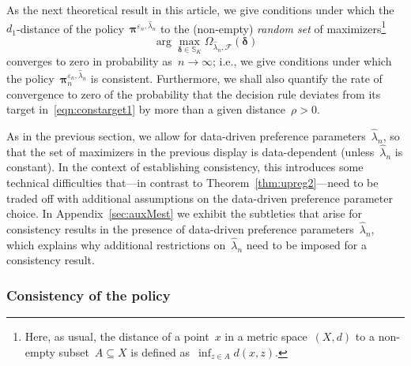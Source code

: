 \documentclass[11pt, a4paper]{article}
\theoremstyle{definition}
\begin{document}
As the next theoretical result in this article, we give conditions under which the~$d_1$-distance of the policy~$\bm{\pi}^{\varepsilon_n, \hat{\lambda}_n}$ to the (non-empty) \emph{random set} of maximizers\footnote{Here, as usual, the distance of a point~$x$ in a metric space~$(X, d)$ to a non-empty subset~$A \subseteq X$ is defined as~$\inf_{z \in A} d(x, z)$.}
\begin{equation}\label{eqn:constarget1}
\arg\max_{\bm{\delta} \in \mathbb{S}_K} \Omega_{  \hat{\lambda}_n, \mathcal{F}}(\bm{\delta})
\end{equation}
converges to zero in probability as~$n \to \infty$; i.e., we give conditions under which the policy~$\bm{\pi}^{\varepsilon_n,   \hat{\lambda}_n}_n$ is consistent. Furthermore, we shall also quantify the rate of convergence to zero of the probability that the decision rule deviates from its target in~\eqref{eqn:constarget1} by more than a given distance~$\rho > 0$. 

As in the previous section, we allow for data-driven preference parameters~$\hat{\lambda}_n$, so that the set of maximizers in the previous display is data-dependent (unless~$\hat{\lambda}_n$ is constant). In the context of establishing consistency, this introduces some technical difficulties that---in contrast to Theorem~\ref{thm:upreg2}---need to be traded off with additional assumptions on the data-driven preference parameter choice. In Appendix~\ref{sec:auxMest} we exhibit the subtleties that arise for consistency results in the presence of data-driven preference parameters~$\hat{\lambda}_n$, which explains why additional restrictions on~$\hat{\lambda}_n$ need to be imposed for a consistency result. 

\subsubsection{Consistency of the policy}
\end{document}
